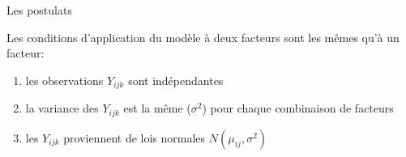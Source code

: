 \documentclass{BeamerTemplate}
\begin{document}
\begin{frame}[t]{Les postulats}

Les conditions d'application du modèle à deux facteurs sont les mêmes qu'à
un facteur:

\medskip
\begin{enumerate}\itemsep3mm
  \item les observations $Y_{ijk}$ sont \alert{indépendantes}\\
  \item la \alert{variance} des $Y_{ijk}$ est la même ($\sigma^2$) pour chaque
  combinaison de facteurs\\
  \item les $Y_{ijk}$ proviennent de lois \alert{normales} $N(\mu_{ij},\sigma^2)$\\
\end{enumerate}

\end{frame}
\end{document}
